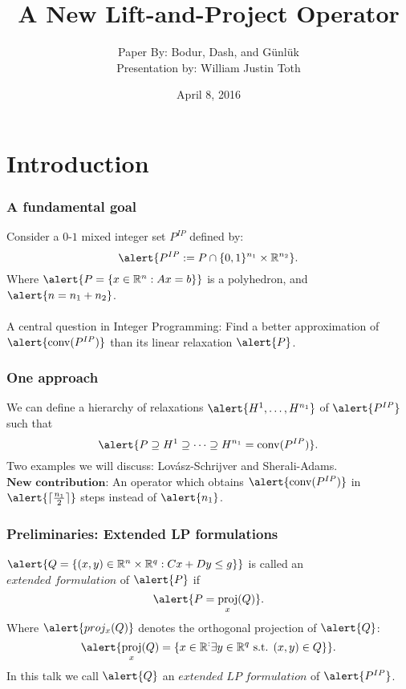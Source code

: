 \documentclass{beamer}
\author{Paper By: Bodur, Dash, and G\"{u}nl\"{u}k\\
Presentation by: William Justin Toth}
\institute{University of Waterloo}
\date{April 8, 2016}
\title{A New Lift-and-Project Operator}
\DeclarePairedDelimiter{\ceil}{\lceil}{\rceil}
\DeclareMathOperator{\conv}{conv}
\DeclareMathOperator{\proj}{proj}
\begin{document}
\begin{frame}
\titlepage
\end{frame}



\section{Introduction}

\begin{frame}
\frametitle{A fundamental goal}
Consider a $0$-$1$ mixed integer set \alert{$P^{IP}$} defined by:
$$\alert{P^{IP} := P \cap \{0,1\}^{n_1} \times \R^{n_2}}.$$
Where $\alert{P = \{x \in \R^n : Ax = b \}}$ is a polyhedron, and $\alert{n = n_1+ n_2}$.
\\\ \\
A central question in Integer Programming: Find a better approximation of $\alert{\conv(P^{IP})}$ than its linear relaxation $\alert{P}$.
\end{frame}

\begin{frame}
\frametitle{One approach}
We can define a hierarchy of relaxations $\alert{H^1, \dots, H^{n_1}}$ of $\alert{P^{IP}}$ such that
$$\alert{P \supseteq H^1 \supseteq \dots \supseteq H^{n_1} = \conv(P^{IP})}.$$
Two examples we will discuss: Lov\'asz-Schrijver and Sherali-Adams.\\
$\textbf{New contribution:}$ An operator which obtains $\alert{\conv(P^{IP})}$ in $\alert{\ceil{\frac{n_1}{2}}}$ steps instead of $\alert{n_1}$.
\end{frame}

\begin{frame}
\frametitle{Preliminaries: Extended LP formulations}
$\alert{Q = \{(x,y) \in \R^n \times \R^q : Cx + Dy \leq g \}}$ is called an $\textit{extended formulation}$ of $\alert{P}$ if
$$\alert{P = \proj_x(Q)}.$$
Where $\alert{proj_x(Q)}$ denotes the orthogonal projection of $\alert{Q}$:
$$\alert{\proj_x(Q) = \{x \in \R^: \exists y \in \R^q \text{ s.t. } (x,y) \in Q\}}.$$ 
In this talk we call $\alert{Q}$ an $\textit{extended LP formulation}$ of $\alert{P^{IP}}$.
\end{frame}
\end{document}
